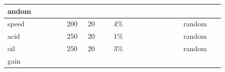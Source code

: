 \begin{longtable}{|>{\RaggedRight}p{0.23462\linewidth}|>{\RaggedRight}p{0.08075\linewidth}|>{\RaggedRight}p{0.10890\linewidth}|>{\RaggedRight}p{0.27027\linewidth}|>{\RaggedRight}p{0.16262\linewidth}|}
andom\footnotemark[64]\\ \hline \hspace*{0pt}\ignorespaces{}\hspace*{0pt}speed\footnotemark[65]&\hspace*{0pt}\ignorespaces{}\hspace*{0pt}200&\hspace*{0pt}\ignorespaces{}\hspace*{0pt}20&\hspace*{0pt}\ignorespaces{}\hspace*{0pt}4\%&\hspace*{0pt}\ignorespaces{}\hspace*{0pt}random\footnotemark[66]\\ \hline \hspace*{0pt}\ignorespaces{}\hspace*{0pt}acid\footnotemark[67]&\hspace*{0pt}\ignorespaces{}\hspace*{0pt}250&\hspace*{0pt}\ignorespaces{}\hspace*{0pt}20&\hspace*{0pt}\ignorespaces{}\hspace*{0pt}1\%&\hspace*{0pt}\ignorespaces{}\hspace*{0pt}random\footnotemark[68]\\ \hline \hspace*{0pt}\ignorespaces{}\hspace*{0pt}oil\footnotemark[69]&\hspace*{0pt}\ignorespaces{}\hspace*{0pt}250&\hspace*{0pt}\ignorespaces{}\hspace*{0pt}20&\hspace*{0pt}\ignorespaces{}\hspace*{0pt}3\%&\hspace*{0pt}\ignorespaces{}\hspace*{0pt}random\footnotemark[70]\\ \hline \hspace*{0pt}\ignorespaces{}\hspace*{0pt}gain 
\end{longtable}
